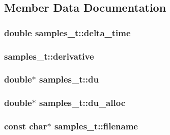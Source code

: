 \subsection{\-Member \-Data \-Documentation}
\hypertarget{structsamples__t_a8f2dc6f752895b08e2c653404f97774a}{
\subsubsection[{delta\-\_\-time}]{\setlength{\rightskip}{0pt plus 5cm}double {\bf samples\-\_\-t\-::delta\-\_\-time}}}\label{structsamples__t_a8f2dc6f752895b08e2c653404f97774a}
\hypertarget{structsamples__t_a3cf66613e04172f79715c361abbe2d70}{
\subsubsection[{derivative}]{ {\bf samples\-\_\-t\-::derivative}}}\label{structsamples__t_a3cf66613e04172f79715c361abbe2d70}
\hypertarget{structsamples__t_a0203a0e4b03745518f76f238a2404f18}{
\subsubsection[{du}]{\setlength{\rightskip}{0pt plus 5cm}double$\ast$ {\bf samples\-\_\-t\-::du}}}\label{structsamples__t_a0203a0e4b03745518f76f238a2404f18}
\hypertarget{structsamples__t_a8a976bae7499cff015eb9bbb25a5c934}{
\subsubsection[{du\-\_\-alloc}]{\setlength{\rightskip}{0pt plus 5cm}double$\ast$ {\bf samples\-\_\-t\-::du\-\_\-alloc}}}\label{structsamples__t_a8a976bae7499cff015eb9bbb25a5c934}
\hypertarget{structsamples__t_a06c9e2c3ff0e2392744acff953175d2f}{
\subsubsection[{filename}]{\setlength{\rightskip}{0pt plus 5cm}const char$\ast$ {\bf samples\-\_\-t\-::filename}}}\label{structsamples__t_a06c9e2c3ff0e2392744acff953175d2f}

